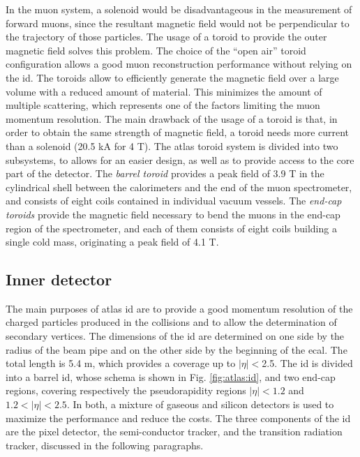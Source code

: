 In the muon system, a solenoid would be disadvantageous in the measurement of forward muons, since the resultant magnetic field would not be perpendicular to the trajectory of those particles. The usage of a toroid to provide the outer magnetic field solves this problem. 
The choice of the “open air” toroid configuration allows a good muon
reconstruction performance without relying on the \gls{id}. 
The toroids allow to efficiently generate the magnetic field over a large volume with a reduced amount
of material. This minimizes the amount of multiple scattering, which represents one
of the factors limiting the muon momentum resolution.
The main drawback of the usage of a toroid is that, in order to obtain the same strength of magnetic field, a toroid needs more current than a solenoid (20.5 kA for 4 T).
The \gls{atlas} toroid system is divided into two subsystems, to allows for an easier design, 
as well as to provide access to the core part of the detector.
The \textit{barrel toroid} \cite{ATLAS:1997ac} provides a peak field of 3.9 T in the cylindrical shell between the calorimeters and the end of the muon spectrometer, and consists of eight coils contained in individual vacuum vessels.  
The \textit{end-cap toroids} \cite{ATLAS:1997ab} provide the magnetic field necessary to bend the muons in the end-cap region of the spectrometer, and each of them consists of eight coils building a single cold mass, originating a peak field of 4.1 T. 



\subsection{Inner detector}
\label{sec:atlas:id}

The main purposes of \gls{atlas} \gls{id} \cite{ATLAS:1997ag,ATLAS:1997af} are to provide a good momentum resolution of the charged particles produced in the collisions and to allow the determination of secondary vertices. The dimensions of the \gls{id} are determined on one side by the 
radius of the beam pipe and on the other side by the beginning of the \gls{ecal}. The total length is 5.4 m, which provides a coverage up to $|\eta|<$2.5.
The \gls{id} is divided into a barrel \gls{id}, whose schema is shown in Fig. \ref{fig:atlas:id}, and two end-cap regions, covering respectively the pseudorapidity regions $|\eta|<1.2$ and $1.2<|\eta|<2.5$. In both, a mixture of gaseous and silicon detectors is used to maximize the performance and reduce the costs. The three components of the \gls{id} are the pixel detector, the semi-conductor tracker, and the transition radiation tracker, discussed in the following paragraphs.


